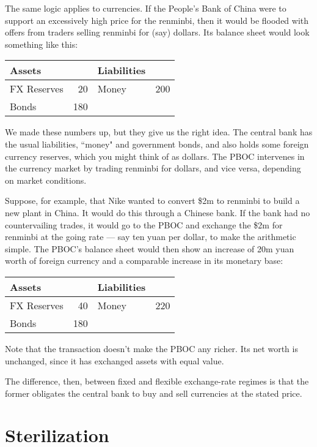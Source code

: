 The same logic applies to currencies.
If the People's Bank of China were to support an excessively high price for
the renminbi, then it would be flooded with offers from traders
selling renminbi for (say) dollars.
Its balance sheet would look something like this:
%
\begin{center}
\begin{tabular}{lr|lr}
               Assets  &     &     Liabilities                     \\
               \hline
               FX Reserves &  20 &     Money &  200   \\
               Bonds   & 180 & \\
\end{tabular}
\end{center}
%
We made these numbers up, but they give us the right idea.
The central bank has the usual liabilities,
``money" and government bonds,
and also holds some foreign currency reserves,
which you might think of as dollars.
The PBOC intervenes in the currency market by trading renminbi for dollars,
and vice versa, depending on market conditions.


Suppose, for example, that Nike wanted to convert
\$2m to renminbi to build a new plant in China.
It would do this through a Chinese bank.
If the bank had no countervailing trades, it would
go to the PBOC and exchange the \$2m for renminbi at the going rate --- say ten yuan per dollar, to make the arithmetic simple.
The PBOC's balance sheet would then show an increase of
20m yuan worth of foreign currency
and a comparable increase in its monetary base:
%
\begin{center}
\begin{tabular}{lr|lr}
               Assets  &     &     Liabilities                     \\
               \hline
               FX Reserves &  40 &     Money &  220   \\
               Bonds  & 180 &
\end{tabular}
\end{center}
%
Note that the transaction doesn't make the PBOC any richer.
Its net worth is unchanged,
since it has exchanged assets with equal value.

The difference, then, between fixed and flexible exchange-rate regimes
is that the former obligates the central bank to buy and sell
currencies at the stated price.

\section{Sterilization}

